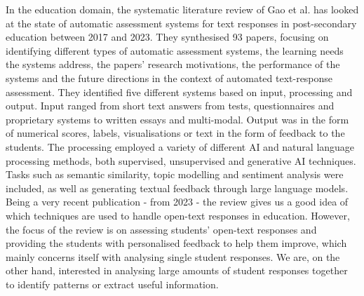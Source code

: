 In the education domain, the systematic literature review of Gao et al. \cite{autoassessmentlitrev} has looked at the state of automatic assessment systems for text responses in post-secondary education between 2017 and 2023. They synthesised 93 papers, focusing on identifying different types of automatic assessment systems, the learning needs the systems address, the papers' research motivations, the performance of the systems and the future directions in the context of automated text-response assessment. They identified five different systems based on input, processing and output. Input ranged from short text answers from tests, questionnaires and proprietary systems to written essays and multi-modal. Output was in the form of numerical scores, labels, visualisations or text in the form of feedback to the students. The processing employed a variety of different AI and natural language processing methods, both supervised, unsupervised and generative AI techniques. Tasks such as semantic similarity, topic modelling and sentiment analysis were included, as well as generating textual feedback through large language models. Being a very recent publication - from 2023 - the review gives us a good idea of which techniques are used to handle open-text responses in education. However, the focus of the review is on assessing students' open-text responses and providing the students with personalised feedback to help them improve, which mainly concerns itself with analysing single student responses. We are, on the other hand, interested in analysing large amounts of student responses together to identify patterns or extract useful information.

